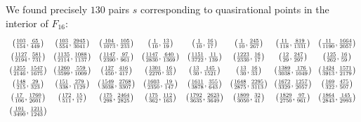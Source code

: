 \documentclass[reqno]{amsart}
\renewcommand{\:}{\colon}
\theoremstyle{definition}
\begin{document}
We found precisely $130$ pairs $s$ corresponding to quasirational
points in the interior of $F_{16}$:
\[ \renewcommand{\arraystretch}{1.5}  \setlength{\arraycolsep}{4pt}
 \begin{array}{cccccccc}
  \left(\frac{ 103}{ 154},\frac{  65}{ 449}\right) &
  \left(\frac{ 103}{ 554},\frac{2945}{3041}\right) &
  \left(\frac{ 104}{1073},\frac{ 105}{ 233}\right) &
  \left(\frac{   1}{  10},\frac{  13}{  19}\right) &
  \left(\frac{   1}{  10},\frac{  16}{  17}\right) &
  \left(\frac{   1}{  10},\frac{ 245}{ 267}\right) &
  \left(\frac{  11}{ 118},\frac{ 819}{1331}\right) &
  \left(\frac{  11}{1190},\frac{1664}{2057}\right)\\
  \left(\frac{1127}{2194},\frac{ 581}{ 731}\right) &
  \left(\frac{1135}{2114},\frac{1088}{1137}\right) &
  \left(\frac{1147}{2390},\frac{  97}{ 961}\right) &
  \left(\frac{1147}{2830},\frac{ 640}{1369}\right) &
  \left(\frac{1151}{3722},\frac{  11}{ 139}\right) &
  \left(\frac{1223}{2330},\frac{  16}{  17}\right) &
  \left(\frac{  12}{  29},\frac{ 247}{ 297}\right) &
  \left(\frac{ 125}{ 262},\frac{  16}{  59}\right)\\
  \left(\frac{1255}{2146},\frac{1547}{1675}\right) &
  \left(\frac{1260}{3599},\frac{ 559}{1009}\right) &
  \left(\frac{ 127}{ 450},\frac{ 416}{ 417}\right) &
  \left(\frac{1301}{2270},\frac{  16}{  33}\right) &
  \left(\frac{  13}{  30},\frac{ 145}{1521}\right) &
  \left(\frac{  13}{  30},\frac{  16}{  33}\right) &
  \left(\frac{1389}{3038},\frac{ 176}{1049}\right) &
  \left(\frac{1424}{3913},\frac{1571}{2179}\right)\\
  \left(\frac{ 148}{ 215},\frac{  29}{ 323}\right) &
  \left(\frac{ 151}{ 338},\frac{ 279}{1129}\right) &
  \left(\frac{1549}{3038},\frac{2768}{3307}\right) &
  \left(\frac{1603}{2350},\frac{  19}{ 147}\right) &
  \left(\frac{1611}{3878},\frac{ 355}{ 643}\right) &
  \left(\frac{1648}{2875},\frac{2295}{3113}\right) &
  \left(\frac{1672}{3329},\frac{1257}{2057}\right) &
  \left(\frac{ 169}{ 322},\frac{ 475}{ 507}\right)\\
  \left(\frac{  17}{ 106},\frac{1760}{2601}\right) &
  \left(\frac{ 172}{ 511},\frac{  15}{  17}\right) &
  \left(\frac{ 175}{ 298},\frac{2464}{2825}\right) &
  \left(\frac{ 175}{ 362},\frac{ 112}{ 163}\right) &
  \left(\frac{1792}{3635},\frac{2623}{3649}\right) &
  \left(\frac{1809}{3050},\frac{  32}{  41}\right) &
  \left(\frac{1829}{2750},\frac{  97}{ 961}\right) &
  \left(\frac{1864}{2843},\frac{ 145}{2993}\right)\\
  \left(\frac{ 191}{3490},\frac{1211}{1243}\right) &

\end{array}\]
\end{document}
